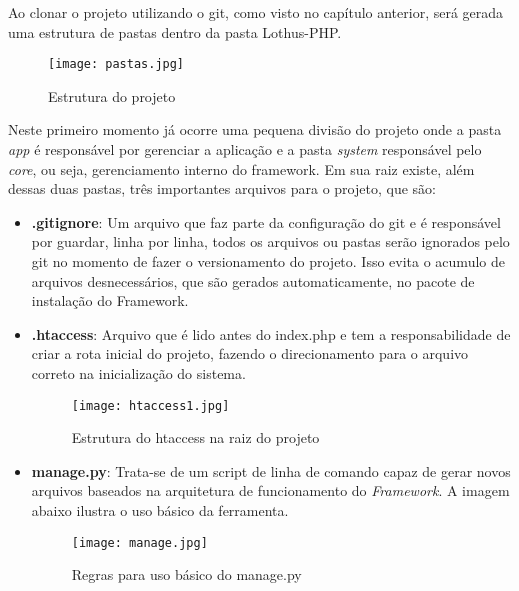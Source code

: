         Ao clonar o projeto utilizando o git, como visto no capítulo anterior, será gerada uma estrutura de pastas dentro da pasta Lothus-PHP.

        \begin{figure}[!htb]
            \centering
            \texttt{[image: pastas.jpg]}
            \caption{\small Estrutura do projeto}
            \label{cap:sass}
        \end{figure}

        Neste primeiro momento já ocorre uma pequena divisão do projeto onde a pasta \emph{app} é responsável por gerenciar a aplicação e a pasta \emph{system} responsável pelo \emph{core}, ou seja, gerenciamento interno do framework. Em sua raiz existe, além dessas duas pastas, três importantes arquivos para o projeto, que são:

        \begin{itemize}
            \item \textbf{.gitignore}: Um arquivo que faz parte da configuração do git e é responsável por guardar, linha por linha, todos os arquivos ou pastas serão ignorados pelo git no momento de fazer o versionamento do projeto. Isso evita o acumulo de arquivos desnecessários, que são gerados automaticamente, no pacote de instalação do Framework.

            \item \textbf{.htaccess}: Arquivo que é lido antes do index.php e tem a responsabilidade de criar a rota inicial do projeto, fazendo o direcionamento para o arquivo correto na inicialização do sistema.

            \begin{figure}[!htb]
                \centering
                \texttt{[image: htaccess1.jpg]}
                \caption{\small Estrutura do htaccess na raiz do projeto}
                \label{cap:sass}
            \end{figure}

            \item \textbf{manage.py}: Trata-se de um script de linha de comando capaz de gerar novos arquivos baseados na arquitetura de funcionamento do \emph{Framework}. A imagem abaixo ilustra o uso básico da ferramenta.

            \begin{figure}[!htb]
                \centering
                \texttt{[image: manage.jpg]}
                \caption{\small Regras para uso básico do manage.py}
                \label{cap:sass}
            \end{figure}


        \end{itemize}

